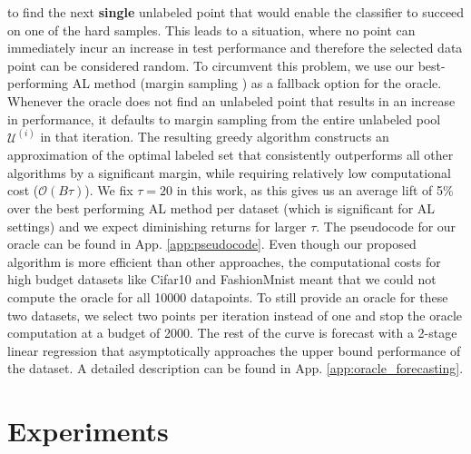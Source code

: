 \documentclass[]{article}
\newcommand{\LL}{\mathcal{L}}
\begin{document}
to find the next \textbf{single} unlabeled point that would enable the
classifier to succeed on one of the hard samples. This leads to a situation,
where no point can immediately incur an increase in test performance and
therefore the selected data point can be considered random. To circumvent this
problem, we use our best-performing AL method (margin sampling
\cite{wang2014new}) as a fallback option for the oracle. Whenever the oracle
does not find an unlabeled point that results in an increase in performance, it
defaults to margin sampling from the entire unlabeled pool $\mathcal{U}^{(i)}$ in that iteration.
The resulting greedy algorithm
constructs an approximation of the optimal labeled set that consistently
outperforms all other algorithms by a significant margin, while requiring
relatively low computational cost ($\mathcal{O}(B\tau)$).
We fix $\tau = 20$ in this work, as this gives us an average lift of 5\% over the
best performing AL method per dataset (which is significant for AL
settings) and we expect diminishing returns for larger $\tau$. The pseudocode
for our oracle can be found in App. \ref{app:pseudocode}.
Even though our proposed algorithm is more efficient than other approaches, the
computational costs for high budget datasets like Cifar10 and FashionMnist meant
that we could not compute the oracle for all 10000 datapoints. To still provide
an oracle for these two datasets, we select two points per iteration instead of
one and stop the oracle computation at a budget of 2000. The rest of the curve
is forecast with a 2-stage linear regression that asymptotically approaches the
upper bound performance of the dataset. A detailed description can be found in
App. \ref{app:oracle_forecasting}.


\section{Experiments}
\end{document}

